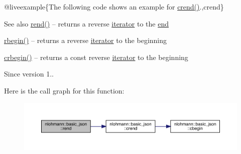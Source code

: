 @liveexample\{The following code shows an example for {\ttfamily \mbox{\hyperlink{classnlohmann_1_1basic__json_a5795b029dbf28e0cb2c7a439ec5d0a88}{crend()}}}.,crend\}

\begin{DoxySeeAlso}{See also}
\mbox{\hyperlink{classnlohmann_1_1basic__json_ac77aed0925d447744676725ab0b6d535}{rend()}} -- returns a reverse \mbox{\hyperlink{classnlohmann_1_1basic__json_a099316232c76c034030a38faa6e34dca}{iterator}} to the \mbox{\hyperlink{classnlohmann_1_1basic__json_a13e032a02a7fd8a93fdddc2fcbc4763c}{end}} 

\mbox{\hyperlink{classnlohmann_1_1basic__json_a1ef93e2006dbe52667294f5ef38b0b10}{rbegin()}} -- returns a reverse \mbox{\hyperlink{classnlohmann_1_1basic__json_a099316232c76c034030a38faa6e34dca}{iterator}} to the beginning 

\mbox{\hyperlink{classnlohmann_1_1basic__json_a1e0769d22d54573f294da0e5c6abc9de}{crbegin()}} -- returns a const reverse \mbox{\hyperlink{classnlohmann_1_1basic__json_a099316232c76c034030a38faa6e34dca}{iterator}} to the beginning
\end{DoxySeeAlso}
\begin{DoxySince}{Since}
version 1.. 
\end{DoxySince}
Here is the call graph for this function\+:
\nopagebreak
\begin{figure}[H]
\begin{center}
\leavevmode
\includegraphics[width=350pt]{classnlohmann_1_1basic__json_a4f73d4cee67ea328d785979c22af0ae1_cgraph}
\end{center}
\end{figure}
\mbox{\label{classnlohmann_1_1basic__json_a25e27ad0c6d53c01871c5485e1f75b96}} 
